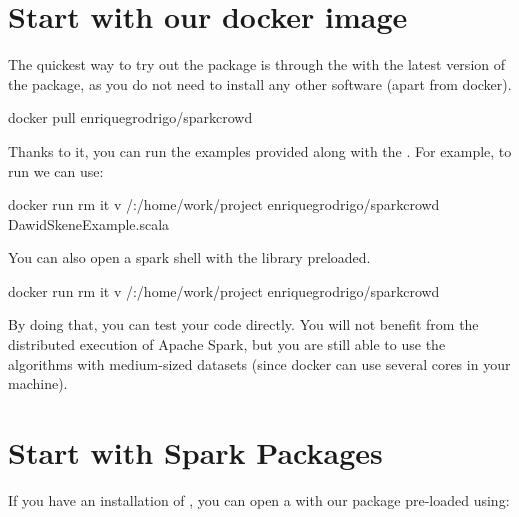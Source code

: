 \documentclass[letterpaper,10pt,english]{sphinxmanual}
\begin{document}
\section{Start with our docker image}
\label{\detokenize{usage/quickstart:start-with-our-docker-image}}
The quickest way to try out the package is through the
 with the latest version of
the package, as you do not need to install any other software (apart from docker).

%
\begin{sphinxVerbatim}[commandchars=\\\{\}]
docker pull enriquegrodrigo/spark\PYGZhy{}crowd
\end{sphinxVerbatim}

Thanks to it, you can run the examples provided along with the
. For example,
to run  we can use:

%
\begin{sphinxVerbatim}[commandchars=\\\{\}]
docker run \PYGZhy{}\PYGZhy{}rm \PYGZhy{}it \PYGZhy{}v /:/home/work/project enriquegrodrigo/spark\PYGZhy{}crowd DawidSkeneExample.scala
\end{sphinxVerbatim}

You can also open a spark shell with the library preloaded.

%
\begin{sphinxVerbatim}[commandchars=\\\{\}]
docker run \PYGZhy{}\PYGZhy{}rm \PYGZhy{}it \PYGZhy{}v /:/home/work/project enriquegrodrigo/spark\PYGZhy{}crowd
\end{sphinxVerbatim}

By doing that, you can test your code directly. You will not benefit from the distributed execution of Apache Spark, but you are still
able to use the algorithms with medium-sized datasets (since docker can use several cores in your machine).


\section{Start with Spark Packages}
\label{\detokenize{usage/quickstart:start-with-spark-packages}}
If you have an installation of , you can open a  with
our package pre-loaded using:
\end{document}
